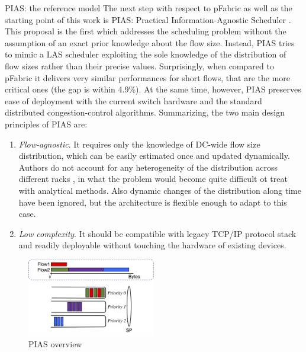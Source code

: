 \begin{subsection}{PIAS: the reference model}
	\label{sec:pias}
	The next step with respect to pFabric as well as the starting point of this work is PIAS: Practical Information-Agnostic Scheduler \cite{pias}. This proposal is the first which addresses the scheduling problem without the assumption of an exact prior knowledge about the flow size. Instead, PIAS tries to mimic a LAS scheduler exploiting the sole knowledge of the distribution of flow sizes rather than their precise values. Surprisingly, when compared to pFabric it delivers very similar performances for short flows, that are the more critical ones (the gap is within 4.9\%). At the same time, however, PIAS preserves ease of deployment with the current switch hardware and the standard distributed congestion-control algorithms.
	Summarizing, the two main design principles of PIAS are:
	
	\begin{enumerate}
		\item \textit{Flow-agnostic}. It requires only the knowledge of DC-wide flow size distribution, which can be easily estimated once and updated dynamically. Authors do not account for any heterogeneity of the distribution across different racks \cite{facebook_dcn}, in what the problem would become quite difficult ot treat with analytical methods. Also dynamic changes of the distribution along time have been ignored, but the architecture is flexible enough to adapt to this case.
		\item \textit{Low complexity}. It should be compatible with legacy TCP/IP protocol stack and readily deployable without touching the hardware of existing devices.
	\end{enumerate}

	\begin{figure}
		\centering
		\includegraphics[width=0.5\textwidth]{Chapter2/Figures/pias_scheme}
		\caption{PIAS overview}
		\label{fig:pias_scheme}
	\end{figure}


\end{subsection}
